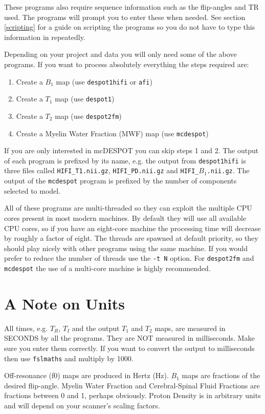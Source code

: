 \documentclass{report}
\begin{document}
These programs also require sequence information such as the flip-angles and TR used. The programs will prompt you to enter these when needed. See section \ref{scripting} for a guide on scripting the programs so you do not have to type this information in repeatedly.

Depending on your project and data you will only need some of the above programs. If you want to process absolutely everything the steps required are:
\begin{enumerate}\itemsep1pt \parskip0pt 
	\item Create a $B_1$ map (use \texttt{despot1hifi} or \texttt{afi})
	\item Create a $T_1$ map (use \texttt{despot1})
	\item Create a $T_2$ map (use \texttt{despot2fm})
	\item Create a Myelin Water Fraction (MWF) map (use \texttt{mcdespot})
\end{enumerate}
If you are only interested in mcDESPOT you can skip steps 1 and 2. The output of each program is prefixed by its name, e.g. the output from \texttt{despot1hifi} is three files called \texttt{HIFI\_T1.nii.gz}, \texttt{HIFI\_PD.nii.gz} and \texttt{HIFI\_$B_1$.nii.gz}. The output of the \texttt{mcdespot} program is prefixed by the number of components selected to model.

All of these programs are multi-threaded so they can exploit the multiple CPU cores present in most modern machines. By default they will use all available CPU cores, so if you have an eight-core machine the processing time will decrease by roughly a factor of eight. The threads are spawned at default priority, so they should play nicely with other programs using the same machine. If you would prefer to reduce the number of threads use the \texttt{-t N} option. For \texttt{despot2fm} and \texttt{mcdespot} the use of a multi-core machine is highly recommended.

\section{A Note on Units}

All times, e.g. $T_R$, $T_I$ and the output $T_1$ and $T_2$ maps, are measured in SECONDS by all the programs. They are NOT measured in milliseconds. Make sure you enter them correctly. If you want to convert the output to milliseconds then use \texttt{fslmaths} and multiply by 1000.

Off-resonance (f0) maps are produced in Hertz (Hz). $B_1$ maps are fractions of the desired flip-angle. Myelin Water Fraction and Cerebral-Spinal Fluid Fractions are fractions between 0 and 1, perhaps obviously. Proton Density is in arbitrary units and will depend on your scanner's scaling factors.
\end{document}

